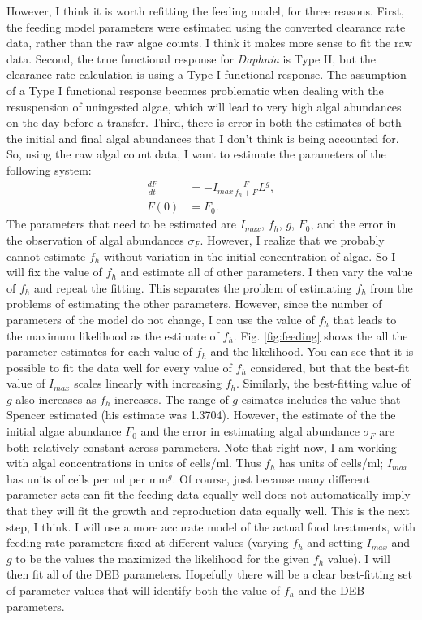 \documentclass[12pt,reqno,final,pdftex]{amsart}\usepackage[]{graphicx}\usepackage[]{color}
\theoremstyle{plain}
\numberwithin{equation}{part}
\begin{document}
However, I think it is worth refitting the feeding model, for three reasons.
First, the feeding model parameters were estimated using the converted clearance rate data, rather than the raw algae counts.
I think it makes more sense to fit the raw data.
Second, the true functional response for \emph{Daphnia} is Type II, but the clearance rate calculation is using a Type I functional response.
The assumption of a Type I functional response becomes problematic when dealing with the resuspension of uningested algae, which will lead to very high algal abundances on the day before a transfer.
Third, there is error in both the estimates of both the initial and final algal abundances that I don't think is being accounted for.
So, using the raw algal count data, I want to estimate the parameters of the following system:
\begin{align*}
\frac{dF}{dt} &= -I_{max} \frac{F}{f_h+F} L^g, \\
F(0) &= F_0.
\end{align*}
The parameters that need to be estimated are $I_{max}$, $f_h$, $g$, $F_0$, and the error in the observation of algal abundances $\sigma_F$.
However, I realize that we probably cannot estimate $f_h$ without variation in the initial concentration of algae.
So I will fix the value of $f_h$ and estimate all of other parameters.
I then vary the value of $f_h$ and repeat the fitting.
This separates the problem of estimating $f_h$ from the problems of estimating the other parameters.
However, since the number of parameters of the model do not change, I can use the value of $f_h$ that leads to the maximum likelihood as the estimate of $f_h$.
Fig. \ref{fig:feeding} shows the all the parameter estimates for each value of $f_h$ and the likelihood.
You can see that it is possible to fit the data well for every value of $f_h$ considered, but that the best-fit value of $I_{max}$ scales linearly with increasing $f_h$.
Similarly, the best-fitting value of $g$ also increases as $f_h$ increases.
The range of $g$ esimates includes the value that Spencer estimated (his estimate was 1.3704).
However, the estimate of the the initial algae abundance $F_0$ and the error in estimating algal abundance $\sigma_F$ are both relatively constant across parameters.
Note that right now, I am working with algal concentrations in units of cells/ml.
Thus $f_h$ has units of cells/ml; $I_{max}$ has units of cells per ml per mm$^g$.
Of course, just because many different parameter sets can fit the feeding data equally well does not automatically imply that they will fit the growth and reproduction data equally well.
This is the next step, I think.
I will use a more accurate model of the actual food treatments, with feeding rate parameters fixed at different values (varying $f_h$ and setting $I_{max}$ and $g$ to be the values the maximized the likelihood for the given $f_h$ value).
I will then fit all of the DEB parameters.
Hopefully there will be a clear best-fitting set of parameter values that will identify both the value of $f_h$ and the DEB parameters.
\end{document}
